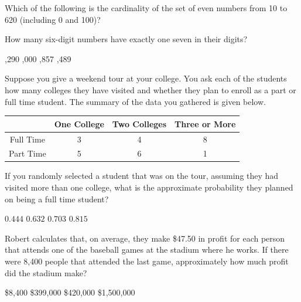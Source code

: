 \documentclass[12pt,letterpaper,answers]{exam}
\begin{document}
\begin{questions}
\vfill

\question Which of the following is the cardinality of the set of even numbers from 10 to 620 (including 0 and 100)?
	\begin{choices}
	\end{choices}

\vfill

\question How many six-digit numbers have exactly one seven in their digits?
	\begin{choices}
	,290
	,000
	,857
	,489
	\end{choices}

\vfill

\question Suppose you give a weekend tour at your college. You ask each of the students how many colleges they have visited and whether they plan to enroll as a part or full time student. The summary of the data you gathered is given below. \par
	\begin{table}[H]
	\centering
	\begin{tabular}{|c|c|c|c|} \hline
	& One College & Two Colleges & Three or More \\ \hline
	Full Time & 3 & 4 & 8 \\ \hline
	Part Time & 5 & 6 & 1 \\ \hline
	\end{tabular}
	\end{table}
If you randomly selected a student that was on the tour, assuming they had visited more than one college, what is the approximate probability they planned on being a full time student?
	\begin{choices}
	\choice $0.444$
	\CorrectChoice $\mathbf{0.632}$
	\choice $0.703$
	\choice $0.815$
	\end{choices}

\vfill

\question Robert calculates that, on average, they make \$47.50 in profit for each person that attends one of the baseball games at the stadium where he works. If there were 8,400 people that attended the last game, approximately how much profit did the stadium make?
	\begin{choices}
	\choice \$8,400
	\CorrectChoice \$399,000
	\choice \$420,000
	\choice \$1,500,000
	\end{choices}

\vfill


\end{questions}
\end{document}
